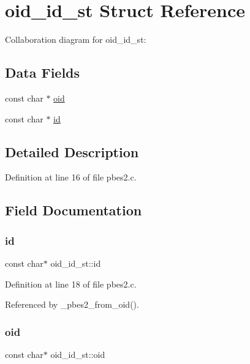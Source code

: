 \hypertarget{structoid__id__st}{}\section{oid\+\_\+id\+\_\+st Struct Reference}
\label{structoid__id__st}


Collaboration diagram for oid\+\_\+id\+\_\+st\+:
\subsection*{Data Fields}
\begin{DoxyCompactItemize}
\item 
const char $\ast$ \mbox{\hyperlink{structoid__id__st_ae4de1969366c98e2d12ca50a85acb433}{oid}}
\item 
const char $\ast$ \mbox{\hyperlink{structoid__id__st_aa04675bddc70fe9d5962eb47ee7301f2}{id}}
\end{DoxyCompactItemize}


\subsection{Detailed Description}


Definition at line 16 of file pbes2.\+c.



\subsection{Field Documentation}
\mbox{\label{structoid__id__st_aa04675bddc70fe9d5962eb47ee7301f2}} 
\subsubsection{\texorpdfstring{id}{id}}
{\footnotesize\ttfamily const char$\ast$ oid\+\_\+id\+\_\+st\+::id}



Definition at line 18 of file pbes2.\+c.



Referenced by \+\_\+pbes2\+\_\+from\+\_\+oid().

\mbox{\label{structoid__id__st_ae4de1969366c98e2d12ca50a85acb433}} 
\subsubsection{\texorpdfstring{oid}{oid}}
{\footnotesize\ttfamily const char$\ast$ oid\+\_\+id\+\_\+st\+::oid}



